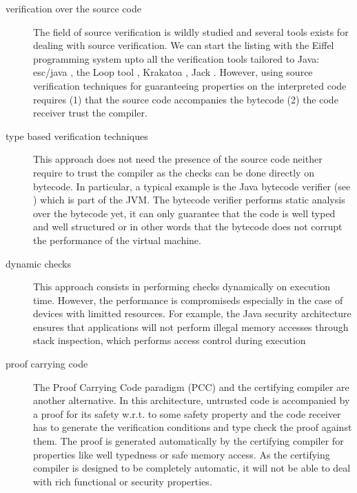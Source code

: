 \begin{description}
   \item [verification over the source code] 
     The field of source verification is wildly studied and several  tools exists for
     dealing with source verification. We can start the listing with the Eiffel programming system \todo{} 
     upto all the verification tools tailored to Java: esc/java \cite{escjava}, the Loop tool \cite{jacobs03java},
     Krakatoa \cite{marche03krakatoa},
     Jack \cite{BRL-JACK}.  
     However, using source verification techniques 
     for guaranteeing properties on the interpreted code requires 
     (1) that the source code accompanies the bytecode (2) the code receiver trust the compiler. 

   \item [type based verification techniques] 
     This approach does not need the presence of the source code neither require to trust the compiler as
     the checks can be done directly on bytecode. In particular, a typical example is the Java bytecode
     verifier (see \cite{Ljbc}) which is part of the JVM. The bytecode verifier performs static analysis over the bytecode yet,
     it can only guarantee that  the code is well typed and well structured or in other words that the
     bytecode does not corrupt the performance of the virtual machine. 

   \item [dynamic checks] This approach consists in performing checks dynamically on execution time.    
     However, the performance is compromiseds especially in the case of 
     devices with limitted resources.  For example,
     the Java security architecture ensures that applications will not
     perform illegal memory accesses through stack inspection, which
     performs access control during execution
   
   \item[proof carrying code]
     The Proof Carrying Code paradigm (PCC) and the certifying compiler \cite{DesNecLee98} are another alternative.
     In this architecture, untrusted code
     is accompanied by a proof for its safety w.r.t. to some safety property and the code receiver has  to generate the 
     verification conditions and type check the proof against them. 
     The proof is generated automatically by the certifying compiler for properties like well typedness or safe memory access. 
     As the certifying compiler is designed to be completely automatic, it will not be able to deal with rich functional or security properties. 
\end{description}



